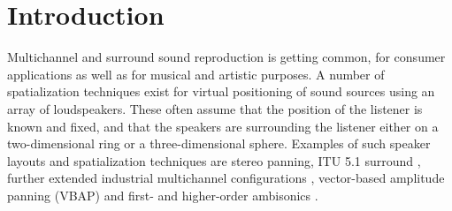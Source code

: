\documentclass[twoside,10pt]{article}
\title{\papertitle}
\begin{document}
    
\maketitle




%
%




\begin{abstract}
Most common techniques for spatialization require the listener to be positioned at a ``sweet spot'' surrounded by loudspeakers. For practical concert, stage and installation applications such layouts may not be undesirable. Distance-Based Amplitude Panning (DBAP) offers an alternative panning based spatialization method where no assumptions are made concerning the layout of the speaker array nor the position of the listener.  DBAP is implemented both as an external for Max/MSP and as a module for the Jamoma framework.
\end{abstract}








%
%


\section{Introduction}\label{sec:introduction}

Multichannel and surround sound reproduction is getting common, for consumer applications as well as for musical and artistic purposes. A number of spatialization techniques exist for virtual positioning of sound sources using an array of loudspeakers. These often assume that the position of the listener is known and fixed, and that the speakers are surrounding the listener either on a two-dimensional ring or a three-dimensional sphere. Examples of such speaker layouts and spatialization techniques are stereo panning, ITU 5.1 surround \cite{ITU:1993_surround_5:1}, further extended industrial multichannel configurations \cite{Rumsey:2001spatial_audio}, vector-based amplitude panning (VBAP) \cite{Pulkki:1997vbap} and first- and higher-order ambisonics \cite{Gerzon:1974surround, Poletti:2000holographic_sound}.
\end{document}
